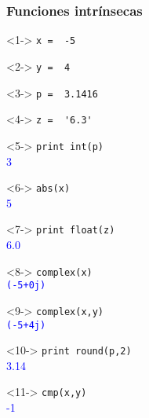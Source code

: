 \begin{frame}[fragile]
\frametitle{Funciones intr\'{i}nsecas}
\fontsize{12}{12}\selectfont
\begin{minipage}{5.5cm}
\begin{exampleblock}{}<1->
	\verb|x =  -5|
\end{exampleblock}
\begin{exampleblock}{}<2->
	\verb|y =  4|
\end{exampleblock}
\begin{exampleblock}{}<3->
	\verb|p =  3.1416|
\end{exampleblock}
\begin{exampleblock}{}<4->
	\verb|z =  '6.3'|
\end{exampleblock}
\begin{exampleblock}{}<5->
	\verb|print int(p)| \\
	\pause
	\textcolor{blue}{3}
\end{exampleblock}
\begin{exampleblock}{}<6->
	\verb|abs(x)| \\
	\pause
	\textcolor{blue}{5}
\end{exampleblock}
\end{minipage}
\hspace{0.5cm}
\begin{minipage}{5.5cm}
\begin{exampleblock}{}<7->
	\verb|print float(z)| \\
	\pause
	\textcolor{blue}{6.0}
\end{exampleblock}
\begin{exampleblock}{}<8->
	\verb|complex(x)| \\
	\pause
	\textcolor{blue}{\texttt{(-5+0j)}}
\end{exampleblock}
\begin{exampleblock}{}<9->
	\verb|complex(x,y)| \\
	\pause
	\textcolor{blue}{\texttt{(-5+4j)}}
\end{exampleblock}
\begin{exampleblock}{}<10->
	\verb|print round(p,2)| \\
	\pause
	\textcolor{blue}{3.14}
\end{exampleblock}
\begin{exampleblock}{}<11->
	\verb|cmp(x,y)| \\
	\pause
	\textcolor{blue}{-1}
\end{exampleblock}
\end{minipage}
\end{frame}
